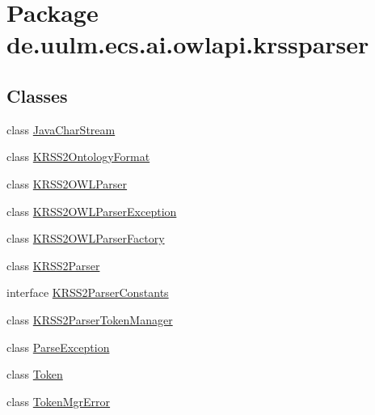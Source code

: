\hypertarget{namespacede_1_1uulm_1_1ecs_1_1ai_1_1owlapi_1_1krssparser}{\section{Package de.\-uulm.\-ecs.\-ai.\-owlapi.\-krssparser}
\label{namespacede_1_1uulm_1_1ecs_1_1ai_1_1owlapi_1_1krssparser}
}
\subsection*{Classes}
\begin{DoxyCompactItemize}
\item 
class \hyperlink{classde_1_1uulm_1_1ecs_1_1ai_1_1owlapi_1_1krssparser_1_1_java_char_stream}{Java\-Char\-Stream}
\item 
class \hyperlink{classde_1_1uulm_1_1ecs_1_1ai_1_1owlapi_1_1krssparser_1_1_k_r_s_s2_ontology_format}{K\-R\-S\-S2\-Ontology\-Format}
\item 
class \hyperlink{classde_1_1uulm_1_1ecs_1_1ai_1_1owlapi_1_1krssparser_1_1_k_r_s_s2_o_w_l_parser}{K\-R\-S\-S2\-O\-W\-L\-Parser}
\item 
class \hyperlink{classde_1_1uulm_1_1ecs_1_1ai_1_1owlapi_1_1krssparser_1_1_k_r_s_s2_o_w_l_parser_exception}{K\-R\-S\-S2\-O\-W\-L\-Parser\-Exception}
\item 
class \hyperlink{classde_1_1uulm_1_1ecs_1_1ai_1_1owlapi_1_1krssparser_1_1_k_r_s_s2_o_w_l_parser_factory}{K\-R\-S\-S2\-O\-W\-L\-Parser\-Factory}
\item 
class \hyperlink{classde_1_1uulm_1_1ecs_1_1ai_1_1owlapi_1_1krssparser_1_1_k_r_s_s2_parser}{K\-R\-S\-S2\-Parser}
\item 
interface \hyperlink{interfacede_1_1uulm_1_1ecs_1_1ai_1_1owlapi_1_1krssparser_1_1_k_r_s_s2_parser_constants}{K\-R\-S\-S2\-Parser\-Constants}
\item 
class \hyperlink{classde_1_1uulm_1_1ecs_1_1ai_1_1owlapi_1_1krssparser_1_1_k_r_s_s2_parser_token_manager}{K\-R\-S\-S2\-Parser\-Token\-Manager}
\item 
class \hyperlink{classde_1_1uulm_1_1ecs_1_1ai_1_1owlapi_1_1krssparser_1_1_parse_exception}{Parse\-Exception}
\item 
class \hyperlink{classde_1_1uulm_1_1ecs_1_1ai_1_1owlapi_1_1krssparser_1_1_token}{Token}
\item 
class \hyperlink{classde_1_1uulm_1_1ecs_1_1ai_1_1owlapi_1_1krssparser_1_1_token_mgr_error}{Token\-Mgr\-Error}
\end{DoxyCompactItemize}
